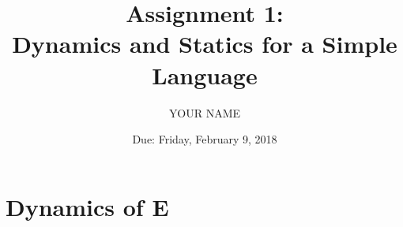 \documentclass[11pt]{exam}
\title{Assignment 1: \\
       Dynamics and Statics for a Simple Language}
\date{Due: Friday, February 9, 2018}
\author{YOUR NAME}
\newcommand{\Lnumstr}{\textbf{\textsf{E}}}
\begin{document}
\maketitle

\begin{questions}
\question  

\question  

\question  

\question  

\question  

\question  

\end{questions}  

\clearpage
\appendix

\section{Dynamics of \Lnumstr}
\end{document}
